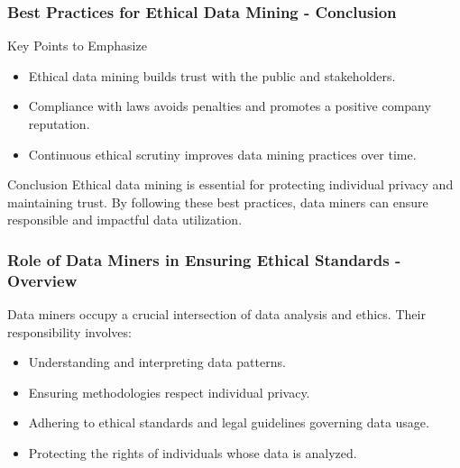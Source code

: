 \documentclass[aspectratio=169]{beamer}
\begin{document}
\begin{frame}[fragile]
    \frametitle{Best Practices for Ethical Data Mining - Conclusion}
    \begin{block}{Key Points to Emphasize}
        \begin{itemize}
            \item Ethical data mining builds trust with the public and stakeholders.
            \item Compliance with laws avoids penalties and promotes a positive company reputation.
            \item Continuous ethical scrutiny improves data mining practices over time.
        \end{itemize}
    \end{block}
    \begin{block}{Conclusion}
        Ethical data mining is essential for protecting individual privacy and maintaining trust. 
        By following these best practices, data miners can ensure responsible and impactful data utilization.
    \end{block}
\end{frame}

\begin{frame}[fragile]
    \frametitle{Role of Data Miners in Ensuring Ethical Standards - Overview}
    Data miners occupy a crucial intersection of data analysis and ethics. Their responsibility involves:
    \begin{itemize}
        \item Understanding and interpreting data patterns.
        \item Ensuring methodologies respect individual privacy.
        \item Adhering to ethical standards and legal guidelines governing data usage.
        \item Protecting the rights of individuals whose data is analyzed.
    \end{itemize}
\end{frame}
\end{document}
